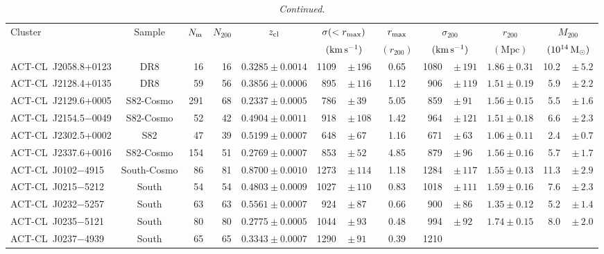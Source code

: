 {\begin{landscape}
\addtocounter{table}{-1}
\begin{table}\footnotesize
\centering
\caption{\emph{Continued}.}
\begin{tabular}{l c r r c r@{}l c r@{}l c r@{}l}
\hline\hline
Cluster & Sample & $N_{\rm m}$ & $N_{200}$ & $z_{\rm cl}$ & \multicolumn{2}{c}{$\sigma(<r_{\rm 
max})$} & $r_{\rm 
max}$ & \multicolumn{2}{c}{$\sigma_{200}$} & $r_{200}$ & \multicolumn{2}{c}{$M_{200}$} \\
 &  &  &  &  & \multicolumn{2}{c}{$(\mathrm{km\,s^{-1}})$} & $(r_{200})$ & 
\multicolumn{2}{c}{$(\mathrm{km\,s^{-1}})$} & $(\mathrm{Mpc})$ & 
\multicolumn{2}{c}{$(10^{14}\,{\rm M}_\odot)$} \\[0.5ex]
\hline
ACT-CL~J2058.8+0123 & DR8 & 16 & 16 & $0.3285\pm0.0014$ & 1109\, & $\pm\,196$ & 0.65 & 1080\, & 
$\pm\,191$ & $1.86\pm0.31$ & 10.2\, & $\pm\,5.2$ \\
ACT-CL~J2128.4+0135 & DR8 & 59 & 56 & $0.3856\pm0.0006$ & 895\, & $\pm\,116$ & 1.12 & 906\, & 
$\pm\,119$ & $1.51\pm0.19$ & 5.9\, & $\pm\,2.2$ \\
ACT-CL~J2129.6+0005 & S82-Cosmo & 291 & 68 & $0.2337\pm0.0005$ & 786\, & $\pm\,39$ & 5.05 & 859\, 
& $\pm\,91$ & $1.56\pm0.15$ & 5.5\, & $\pm\,1.6$ \\
ACT-CL~J2154.5$-$0049 & S82-Cosmo & 52 & 42 & $0.4904\pm0.0011$ & 918\, & $\pm\,108$ & 1.42 & 
964\, & $\pm\,121$ & $1.51\pm0.18$ & 6.6\, & $\pm\,2.3$ \\
ACT-CL~J2302.5+0002 & S82 & 47 & 39 & $0.5199\pm0.0007$ & 648\, & $\pm\,67$ & 1.16 & 671\, & 
$\pm\,63$ & $1.06\pm0.11$ & 2.4\, & $\pm\,0.7$ \\
ACT-CL~J2337.6+0016 & S82-Cosmo & 154 & 51 & $0.2769\pm0.0007$ & 853\, & $\pm\,52$ & 4.85 & 879\, 
& $\pm\,96$ & $1.56\pm0.16$ & 5.7\, & $\pm\,1.7$ \\
%
\hline
%
ACT-CL~J0102$-$4915 & South-Cosmo & 86 & 81 & $0.8700\pm0.0010$ & 1273\, & $\pm\,114$ & 1.18 & 
1284\, & $\pm\,117$ & $1.55\pm0.13$ & 11.3\, & $\pm\,2.9$ \\
ACT-CL~J0215$-$5212 & South & 54 & 54 & $0.4803\pm0.0009$ & 1027\, & $\pm\,110$ & 0.83 & 1018\, & 
$\pm\,111$ & $1.59\pm0.16$ & 7.6\, & $\pm\,2.3$ \\
ACT-CL~J0232$-$5257 & South & 63 & 63 & $0.5561\pm0.0007$ & 924\, & $\pm\,87$ & 0.66 & 900\, & 
$\pm\,86$ & $1.35\pm0.12$ & 5.2\, & $\pm\,1.4$ \\
ACT-CL~J0235$-$5121 & South & 80 & 80 & $0.2775\pm0.0005$ & 1044\, & $\pm\,93$ & 0.48 & 994\, & 
$\pm\,92$ & $1.74\pm0.15$ & 8.0\, & $\pm\,2.0$ \\
ACT-CL~J0237$-$4939 & South & 65 & 65 & $0.3343\pm0.0007$ & 1290\, & $\pm\,91$ & 0.39 & 1210\, & 

\end{tabular}
\end{table}
\end{landscape}}
